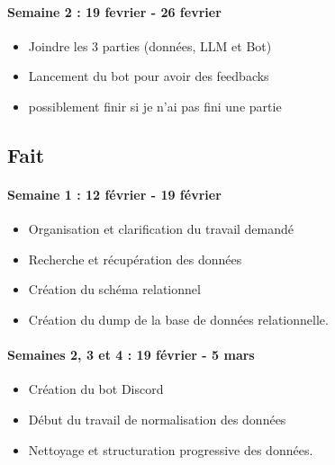 \documentclass[12pt]{article}
\begin{document}
            \paragraph{Semaine 2 : 19 fevrier - 26 fevrier} 
                \begin{itemize} 
                    \item Joindre les 3 parties (données, LLM et Bot) 
                    \item Lancement du bot pour avoir des feedbacks 
                    \item possiblement finir si je n'ai pas fini une partie 
                \end{itemize} 
        \subsection{Fait}

            \paragraph{Semaine 1 : 12 février - 19 février}
                \begin{itemize}
                    \item Organisation et clarification du travail demandé 
                    \item Recherche et récupération des données 
                    \item Création du schéma relationnel 
                    \item Création du dump de la base de données relationnelle.
                \end{itemize}

            \paragraph{Semaines 2, 3 et 4 : 19 février - 5 mars}
                \begin{itemize}
                    \item Création du bot Discord 
                    \item Début du travail de normalisation des données 
                    \item Nettoyage et structuration progressive des données.
                \end{itemize}
\end{document}
